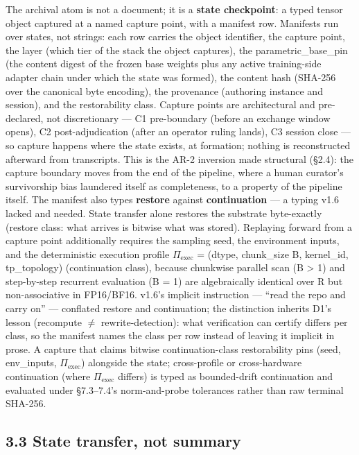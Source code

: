 \documentclass[11pt]{article}
\begin{document}
The archival atom is not a document; it is a \textbf{state checkpoint}: a typed tensor object captured at a named capture point, with a manifest row. Manifests run over states, not strings: each row carries the object identifier, the capture point, the layer (which tier of the stack the object captures), the parametric\_base\_pin (the content digest of the frozen base weights plus any active training-side adapter chain under which the state was formed), the content hash (SHA-256 over the canonical byte encoding), the provenance (authoring instance and session), and the restorability class. Capture points are architectural and pre-declared, not discretionary --- C1 pre-boundary (before an exchange window opens), C2 post-adjudication (after an operator ruling lands), C3 session close --- so capture happens where the state exists, at formation; nothing is reconstructed afterward from transcripts. This is the AR-2 inversion made structural (\S{}2.4): the capture boundary moves from the end of the pipeline, where a human curator's survivorship bias laundered itself as completeness, to a property of the pipeline itself. The manifest also types \textbf{restore} against \textbf{continuation} --- a typing v1.6 lacked and needed. State transfer alone restores the substrate byte-exactly (restore class: what arrives is bitwise what was stored). Replaying forward from a capture point additionally requires the sampling seed, the environment inputs, and the deterministic execution profile \(\Pi_{\text{exec}}\) = (dtype, chunk\_size B, kernel\_id, tp\_topology) (continuation class), because chunkwise parallel scan (B \textgreater{} 1) and step-by-step recurrent evaluation (B = 1) are algebraically identical over R but non-associative in FP16/BF16. v1.6's implicit instruction --- ``read the repo and carry on'' --- conflated restore and continuation; the distinction inherits D1's lesson (recompute \(\neq\) rewrite-detection): what verification can certify differs per class, so the manifest names the class per row instead of leaving it implicit in prose. A capture that claims bitwise continuation-class restorability pins (seed, env\_inputs, \(\Pi_{\text{exec}}\)) alongside the state; cross-profile or cross-hardware continuation (where \(\Pi_{\text{exec}}\) differs) is typed as bounded-drift continuation and evaluated under \S{}7.3--7.4's norm-and-probe tolerances rather than raw terminal SHA-256.

\subsection{3.3 State transfer, not summary}\label{state-transfer-not-summary}
\end{document}
